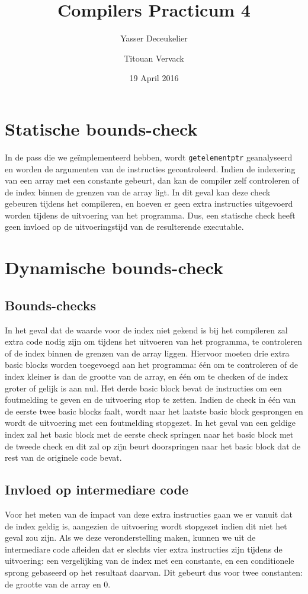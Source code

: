 \documentclass{article}
\title{Compilers Practicum 4}
\author{Yasser Deceukelier \and Titouan Vervack}
\date{19 April 2016}
\begin{document}
\maketitle

\section{Statische bounds-check}

In de pass die we geïmplementeerd hebben, wordt \verb!getelementptr! geanalyseerd en worden de argumenten van de instructies gecontroleerd. Indien de indexering van een array met een constante gebeurt, dan kan de compiler zelf controleren of de index binnen de grenzen van de array ligt. In dit geval kan deze check gebeuren tijdens het compileren, en hoeven er geen extra instructies uitgevoerd worden tijdens de uitvoering van het programma. Dus, een statische check heeft geen invloed op de uitvoeringstijd van de resulterende executable.

\section{Dynamische bounds-check}

\subsection{Bounds-checks}
In het geval dat de waarde voor de index niet gekend is bij het compileren zal extra code nodig zijn om tijdens het uitvoeren van het programma, te controleren of de index binnen de grenzen van de array liggen. Hiervoor moeten drie extra basic blocks worden toegevoegd aan het programma: \'e\'en om te controleren of de index kleiner is dan de grootte van de array, en \'e\'en om te checken of de index groter of gelijk is aan nul. Het derde basic block bevat de instructies om een foutmelding te geven en de uitvoering stop te zetten. Indien de check in \'e\'en van de eerste twee basic blocks faalt, wordt naar het laatste basic block gesprongen en wordt de uitvoering met een foutmelding stopgezet. In het geval van een geldige index zal het basic block met de eerste check springen naar het basic block met de tweede check en dit zal op zijn beurt doorspringen naar het basic block dat de rest van de originele code bevat.

\subsection{Invloed op intermediare code}
Voor het meten van de impact van deze extra instructies gaan we er vanuit dat de index geldig is, aangezien de uitvoering wordt stopgezet indien dit niet het geval zou zijn. Als we deze veronderstelling maken, kunnen we uit de intermediare code afleiden dat er slechts vier extra instructies zijn tijdens de uitvoering: een vergelijking van de index met een constante, en een conditionele sprong gebaseerd op het resultaat daarvan. Dit gebeurt dus voor twee constanten: de grootte van de array en 0.
\end{document}
